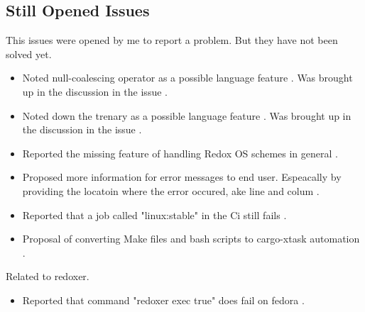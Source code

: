 \subsection{Still Opened Issues}

This issues were opened by me to report a problem. But they have not been solved yet.

\begin{itemize}
	\item Noted null-coalescing operator as a possible language feature \cite{issue_null_coalescing_operator}. Was brought up in the discussion in the issue \cite{pr_subst_method}.
	\item Noted down the trenary as a possible language feature \cite{issue_ternary_operator_arrays_strings}. Was brought up in the discussion in the issue \cite{pr_subst_method}.
	\item Reported the missing feature of handling Redox OS schemes in general \cite{issue_disk_scheme}.
	\item Proposed more information for error messages to end user. Espeacally by providing the locatoin where the error occured, ake line and colum \cite{issue_enrich_error_message_information}.
	\item Reported that a job called "linux:stable" in the Ci still fails \cite{issue_ci_linux_stable_fail}.
	\item Proposal of converting Make files and bash scripts to cargo-xtask automation \cite{issue_convert_make_files_to_xtask}.
\end{itemize}

Related to \gls{redoxer}.

\begin{itemize}
	\item Reported that command "redoxer exec true" does fail on fedora \cite{issue_redoxer_exec_true}.
\end{itemize}


